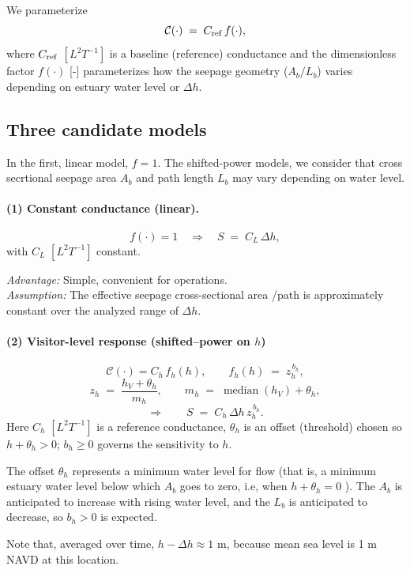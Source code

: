 \documentclass[preprint,12pt,authoryear]{elsarticle}
\begin{document}
We parameterize
\[
\mathcal{C}(\cdot) \;=\; C_{\rm ref}\, f(\cdot),
\]
where $C_{\rm ref}$ $[L^2T^{-1}]$ is a baseline (reference) conductance and the dimensionless factor $f(\cdot)$ [-] parameterizes how the seepage geometry ($A_b/L_b$) varies depending on estuary water level or $\Delta h$.


\subsection*{Three candidate models}

In the first, linear model, $f = 1$.
The shifted-power models, we consider that  cross secrtional seepage area  $A_b$ and path length $L_b$ may vary depending on water level. 

\paragraph{(1) Constant conductance (linear).}
\[
f(\cdot)=1
\quad\Rightarrow\quad
S \;=\; C_L\,\Delta h,
\]
with $C_L$ $[L^2T^{-1}]$ constant.

\noindent\textit{Advantage:} Simple, convenient for operations. \\
\textit{Assumption:} The effective seepage cross-sectional area /path is approximately constant over the analyzed range of $\Delta h$.

\paragraph{(2) Visitor-level response (shifted--power on $h$)}

\[
\mathcal{C}(\cdot)= C_h\,f_h(h),
\qquad
f_h(h) \;=\; z_{h}^{\,b_{h}},
\]
\[
z_{h}\;=\;\frac{h_{V}+\theta_{h}}{\,m_{h}\,},\qquad
m_{h}\;=\;\operatorname{median}(h_{V})+\theta_{h},
\]
\[
\Rightarrow\qquad
S \;=\; C_h\,\Delta h\, z_{h}^{\,b_{h}}.
\]
Here $C_h$ $[L^2T^{-1}]$ is a reference conductance, 
$\theta_h$ is an offset (threshold) chosen so $h+\theta_h>0$; $b_h\ge 0$ governs the sensitivity to $h$.

The offset $\theta_h$ represents a minimum water level for flow (that is, a minimum estuary water level below which $A_b$ goes to zero, i.e, when $h + {\theta_h} = 0$ ).  
The $A_b$ is anticipated to increase with rising water level, and the $L_b$ is anticipated to decrease, so $b_h> 0 $ is expected.

Note that, averaged over time, $h- \Delta h \approx 1$  m, because mean sea level is 1 m NAVD at this location.   
\end{document}
